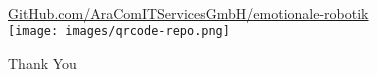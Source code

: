 \documentclass[aspectratio=169]{beamer}
\begin{document}
\begin{frame}[c]{}
  \centering
  \begin{minipage}{\textwidth}
    \centering
    \Large {}\\
    \href{https://github.com/wieerwill/emotional-robotics}{GitHub.com/AraComITServicesGmbH/emotionale-robotik}\\
    \vspace{.4cm}
    \texttt{[image: images/qrcode-repo.png]}
  \end{minipage}
\end{frame}

\begin{frame}[c]{}
  \centering
  \begin{minipage}{\textwidth}
    \centering
    \Huge Thank You\\
    \Large {}
  \end{minipage}
\end{frame}
\end{document}
